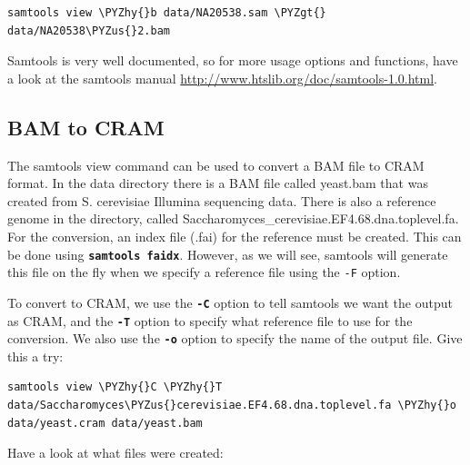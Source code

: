 \documentclass[11pt]{article}
\makeatletter
\def\PYZus{\char`\_}
\def\PYZgt{\char`\>}
\def\PYZhy{\char`\-}
\newcommand{\boxspacing}{\kern\kvtcb@left@rule\kern\kvtcb@boxsep}
\newcommand{\prompt}[4]{
        {\ttfamily\llap{{\color{blue}\LARGE\faKeyboardO\hspace{3pt}#4}}\vspace{-\baselineskip}}
    }
\makeatother
\begin{document}
    \begin{tcolorbox}[breakable, size=fbox, boxrule=1pt, pad at break*=1mm,colback=cellbackground, colframe=cellborder]
\prompt{In}{incolor}{ }{\boxspacing}
\begin{Verbatim}[commandchars=\\\{\}]
samtools view \PYZhy{}b data/NA20538.sam \PYZgt{} data/NA20538\PYZus{}2.bam
\end{Verbatim}
\end{tcolorbox}

    Samtools is very well documented, so for more usage options and
functions, have a look at the samtools manual
\url{http://www.htslib.org/doc/samtools-1.0.html}.

    \hypertarget{bam-to-cram}{%
\subsection{BAM to CRAM}\label{bam-to-cram}}

The samtools view command can be used to convert a BAM file to CRAM
format. In the data directory there is a BAM file called yeast.bam that
was created from S. cerevisiae Illumina sequencing data. There is also a
reference genome in the directory, called
Saccharomyces\_cerevisiae.EF4.68.dna.toplevel.fa. For the conversion, an
index file (.fai) for the reference must be created. This can be done
using \textbf{\texttt{samtools\ faidx}}. However, as we will see,
samtools will generate this file on the fly when we specify a reference
file using the \texttt{-F} option.

To convert to CRAM, we use the \textbf{\texttt{-C}} option to tell
samtools we want the output as CRAM, and the \textbf{\texttt{-T}} option
to specify what reference file to use for the conversion. We also use
the \textbf{\texttt{-o}} option to specify the name of the output file.
Give this a try:

    \begin{tcolorbox}[breakable, size=fbox, boxrule=1pt, pad at break*=1mm,colback=cellbackground, colframe=cellborder]
\prompt{In}{incolor}{ }{\boxspacing}
\begin{Verbatim}[commandchars=\\\{\}]
samtools view \PYZhy{}C \PYZhy{}T data/Saccharomyces\PYZus{}cerevisiae.EF4.68.dna.toplevel.fa \PYZhy{}o data/yeast.cram data/yeast.bam
\end{Verbatim}
\end{tcolorbox}

    Have a look at what files were created:
\end{document}
